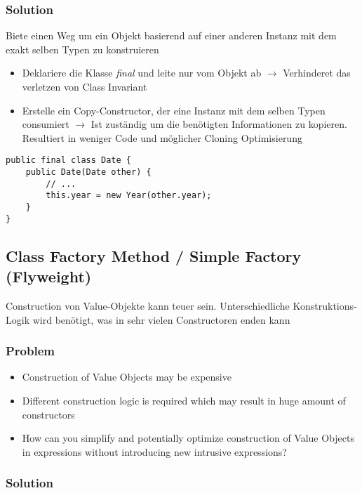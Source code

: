 \subsubsection{Solution}
Biete einen Weg um ein Objekt basierend auf einer anderen Instanz mit dem exakt selben Typen zu konstruieren

\begin{itemize}
    \item Deklariere die Klasse \textit{final} und leite nur vom Objekt ab $\rightarrow$ Verhinderet das verletzen von Class Invariant
    \item Erstelle ein Copy-Constructor, der eine Instanz mit dem selben Typen consumiert $\rightarrow$ Ist zuständig um die benötigten Informationen zu kopieren. Resultiert in weniger Code und möglicher Cloning Optimisierung
\end{itemize}
\begin{lstlisting}
public final class Date {
    public Date(Date other) {
        // ...
        this.year = new Year(other.year);
    }
}
\end{lstlisting}

\vfill\null
\columnbreak

\subsection{Class Factory Method / Simple Factory (Flyweight)}

Construction von Value-Objekte kann teuer sein. Unterschiedliche Konstruktions-Logik wird benötigt, was in sehr vielen Constructoren enden kann

\subsubsection{Problem}
\begin{itemize}
    \item Construction of Value Objects may be expensive
    \item Different construction logic is required which may result in huge amount of constructors
    \item How can you simplify and potentially optimize construction of Value Objects in expressions without introducing new intrusive expressions?
\end{itemize}

\subsubsection{Solution}

